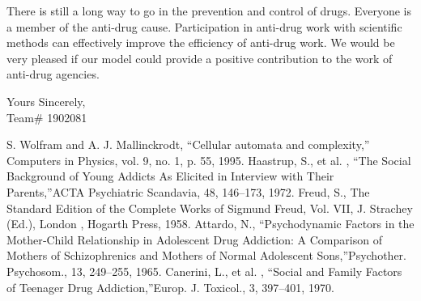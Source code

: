 \documentclass{mcmthesis}
\begin{document}
There is still a long way to go in the prevention and control of drugs. Everyone is a member of the anti-drug cause. Participation in anti-drug work with scientific methods can effectively improve the efficiency of anti-drug work. We would be very pleased if our model could provide a positive contribution to the work of anti-drug agencies.

\noindent Yours Sincerely,\\
Team\# 1902081


\clearpage

\begin{thebibliography}{99}
 S. Wolfram and A. J. Mallinckrodt, “Cellular automata and complexity,” Computers in Physics, vol. 9, no. 1, p. 55, 1995.
 Haastrup, S., et al. , “The Social Background of Young Addicts As Elicited in Interview with Their Parents,”ACTA Psychiatric Scandavia, 48, 146–173, 1972. 
 Freud, S., The Standard Edition of the Complete Works of Sigmund Freud, Vol. VII, J. Strachey (Ed.), London , Hogarth Press, 1958. 
 Attardo, N., “Psychodynamic Factors in the Mother‐Child Relationship in Adolescent Drug Addiction: A Comparison of Mothers of Schizophrenics and Mothers of Normal Adolescent Sons,”Psychother. Psychosom., 13, 249–255, 1965.
  Canerini, L., et al. , “Social and Family Factors of Teenager Drug Addiction,”Europ. J. Toxicol., 3, 397–401, 1970. 

\end{thebibliography}
\end{document}
